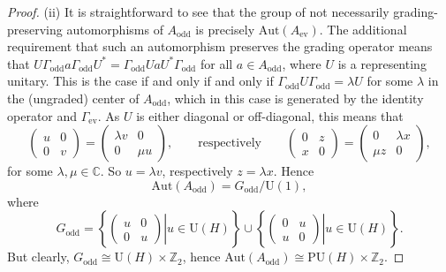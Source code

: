 \documentclass[11pt]{article}
\numberwithin{equation}{section}
\numberwithin{equation}{section}
\newcommand{\Z}{\mathbb{Z}}
\newcommand{\C}{\mathbb{C}}
\newcommand{\Aut}{\mathrm{Aut}}
\newcommand{\U}{\mathrm{U}}
\begin{document}
\begin{proof}
(ii) It is straightforward to see that the group of not necessarily grading-preserving automorphisms of $A_{\mathrm{odd}}$ is precisely $\Aut(A_{\mathrm{ev}})$.
The additional requirement that such an automorphism preserves the grading operator means that $U \Gamma_{\mathrm{odd}} a \Gamma_{\mathrm{odd}} U^* = \Gamma_{\mathrm{odd}} U a U^* \Gamma_{\mathrm{odd}}$ for all $a \in A_{\mathrm{odd}}$, where $U$ is a representing unitary.
This is the case if and only if and only if $\Gamma_{\mathrm{odd}} U \Gamma_{\mathrm{odd}} = \lambda U$ for some $\lambda$ in the (ungraded) center of $A_{\mathrm{odd}}$, which in this case is generated by the identity operator and $\Gamma_{\mathrm{ev}}$.
As $U$ is either diagonal or off-diagonal, this means that
 \begin{equation*}
 	\begin{pmatrix} u & 0 \\ 0 & v \end{pmatrix} = \begin{pmatrix} \lambda v & 0 \\ 0 & \mu u \end{pmatrix}, \qquad \text{respectively} \qquad \begin{pmatrix} 0 & z \\ x & 0 \end{pmatrix} = \begin{pmatrix} 0 & \lambda x \\ \mu z& 0 \end{pmatrix},
 \end{equation*}
 for some $\lambda, \mu \in \C$.
 So $u = \lambda v$, respectively $z = \lambda x$.
 Hence
\begin{equation*} %
 \Aut(A_{\mathrm{odd}}) = G_{\mathrm{odd}} / \U(1),
\end{equation*}
where
\begin{equation} \label{DefGodd}
 G_{\mathrm{odd}} = \left\{ \left.\begin{pmatrix} u & 0 \\ 0 & u \end{pmatrix} \right| u \in \U(H)\right\} \cup \left\{ \left.\begin{pmatrix} 0 & u \\ u & 0 \end{pmatrix} \right| u \in \U(H)\right\}.
\end{equation}
But clearly, $G_{\mathrm{odd}} \cong \U(H) \times \Z_2$, hence $\Aut(A_{\mathrm{odd}}) \cong \mathrm{PU}(H) \times \Z_2$.
\end{proof}
\end{document}
